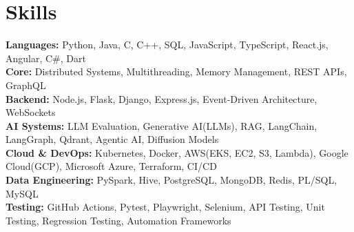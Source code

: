 \documentclass[10pt, letterpaper]{article}
\newenvironment{onecolentry}{
    \par\noindent
}{
    \par
}
\begin{document}

\section{Skills}
\textbf{Languages:} Python, Java, C, C++, SQL, JavaScript, TypeScript, React.js, Angular, C\#, Dart\\
\textbf{Core:} Distributed Systems, Multithreading, Memory Management, REST APIs, GraphQL \\
\textbf{Backend:} Node.js, Flask, Django, Express.js, Event-Driven Architecture, WebSockets \\
\textbf{AI Systems:} LLM Evaluation, Generative AI(LLMs), RAG, LangChain, LangGraph, Qdrant, Agentic AI, Diffusion Models \\
\textbf{Cloud \& DevOps:} Kubernetes, Docker, AWS(EKS, EC2, S3, Lambda), Google Cloud(GCP), Microsoft Azure, Terraform, CI/CD \\
\textbf{Data Engineering:} PySpark, Hive, PostgreSQL, MongoDB, Redis, PL/SQL, MySQL \\
\textbf{Testing:} GitHub Actions, Pytest, Playwright, Selenium, API Testing, Unit Testing, Regression Testing, Automation Frameworks



\end{document}
